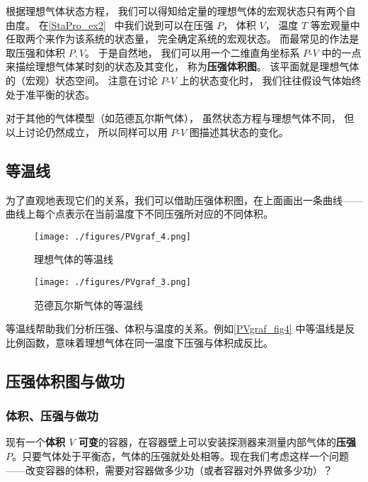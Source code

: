 
\begin{issues}
\issueDraft
\end{issues}


根据理想气体状态方程， 我们可以得知给定量的理想气体的宏观状态只有两个自由度。 在\autoref{StaPro_ex2}~ 中我们说到可以在压强 $P$， 体积 $V$， 温度 $T$ 等宏观量中任取两个来作为该系统的状态量， 完全确定系统的宏观状态。 而最常见的作法是取压强和体积 $P,V$。 于是自然地， 我们可以用一个二维直角坐标系 $P$-$V$ 中的一点来描绘理想气体某时刻的状态及其变化， 称为\textbf{压强体积图}。 该平面就是理想气体的（宏观）状态空间。 注意在讨论 $P$-$V$ 上的状态变化时， 我们往往假设气体始终处于准平衡的状态。

对于其他的气体模型（如范德瓦尔斯气体）， 虽然状态方程与理想气体不同， 但以上讨论仍然成立， 所以同样可以用 $P$-$V$ 图描述其状态的变化。


\subsection{等温线}
为了直观地表现它们的关系，我们可以借助压强体积图，在上面画出一条曲线——曲线上每个点表示在当前温度下不同压强所对应的不同体积。
\begin{figure}[ht]
\centering
\texttt{[image: ./figures/PVgraf\_4.png]}
\caption{理想气体的等温线} \label{PVgraf_fig4}
\end{figure}
\begin{figure}[ht]
\centering
\texttt{[image: ./figures/PVgraf\_3.png]}
\caption{范德瓦尔斯气体的等温线} \label{PVgraf_fig3}
\end{figure}

等温线帮助我们分析压强、体积与温度的关系。例如\autoref{PVgraf_fig4} 中等温线是反比例函数，意味着理想气体在同一温度下压强与体积成反比。

\subsection{压强体积图与做功}

\subsubsection{体积、压强与做功}
现有一个\textbf{体积 $V$ 可变}的容器，在容器壁上可以安装探测器来测量内部气体的\textbf{压强 $P$}。只要气体处于平衡态，气体的压强就处处相等。现在我们考虑这样一个问题——改变容器的体积，需要对容器做多少功（或者容器对外界做多少功）？

